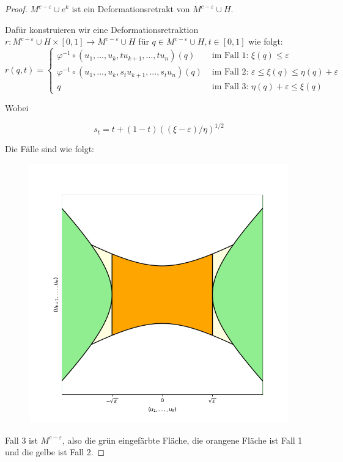 \begin{proof}
     $M^{c - \varepsilon} \cup e^{k}$ ist ein 
    Deformationsretrakt von $M^{c - \varepsilon} \cup H$.

    Dafür konstruieren wir eine Deformationsretraktion
    $r: M^{c - \varepsilon} \cup H \times [0,1] \to M^{c - \varepsilon} \cup H$
    für $q \in M^{c - \varepsilon} \cup H, t \in [0, 1]$ wie folgt:
    \[
        r(q, t) = \begin{cases}
            \varphi^{-1} \circ (u_1, ..., u_k, tu_{k + 1}, ..., tu_n)(q)
                & \text{ im Fall 1: } \xi(q) \leq \varepsilon \\
            \varphi^{-1} \circ (u_1, ..., u_k, s_tu_{k + 1}, ..., s_tu_n)(q)
                & \text{ im Fall 2: } \varepsilon \leq \xi(q) \leq \eta(q) + \varepsilon \\
            q & \text{ im Fall 3: } \eta(q) + \varepsilon \leq \xi(q)
        \end{cases}
    \]

    Wobei 

    \[ s_t = t + (1 -t)((\xi - \varepsilon)/\eta)^{1/2} \]

    Die Fälle sind wie folgt:

    \begin{figure}[H]
        \centering
        \includegraphics[width=0.8\linewidth]{resources/Me-Diagram9-handle-cases.png}
        \label{me-diagram9}
    \end{figure}

    Fall 3 ist $M^{c - \varepsilon}$, also die grün eingefärbte Fläche, die
    orangene Fläche ist Fall 1 und die gelbe ist Fall 2.


\end{proof}

